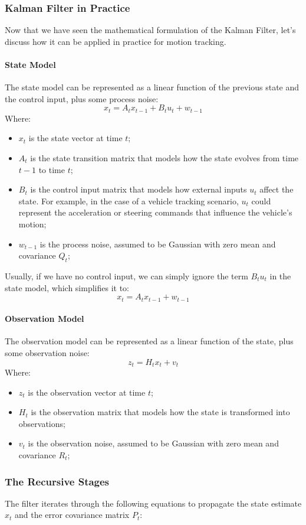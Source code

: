 \subsubsection{Kalman Filter in Practice}
Now that we have seen the mathematical formulation of the Kalman Filter, let's discuss how it can be applied in practice for motion tracking.

\paragraph{State Model}
The state model can be represented as a linear function of the previous state and the control input, plus some process noise:
\[ x_t = A_t x_{t-1} + B_t u_t + w_{t-1} \] 
Where:
\begin{itemize}
    \item $x_t$ is the state vector at time $t$;
    \item $A_t$ is the state transition matrix that models how the state evolves from time $t-1$ to time $t$;
    \item $B_t$ is the control input matrix that models how external inputs $u_t$ affect the state. For example,
    in the case of a vehicle tracking scenario, $u_t$ could represent the acceleration or steering commands that influence the vehicle's motion;
    \item $w_{t-1}$ is the process noise, assumed to be Gaussian with zero mean and covariance $Q_t$;
\end{itemize}
Usually, if we have no control input, we can simply ignore the term $B_t u_t$ in the state model, which simplifies it to:
\[ x_t = A_t x_{t-1} + w_{t-1} \]

\paragraph{Observation Model}
The observation model can be represented as a linear function of the state, plus some observation noise:
\[ z_t = H_t x_t + v_t \]
Where:
\begin{itemize}
    \item $z_t$ is the observation vector at time $t$;
    \item $H_t$ is the observation matrix that models how the state is transformed into observations;
    \item $v_t$ is the observation noise, assumed to be Gaussian with zero mean and covariance $R_t$;
\end{itemize}

\subsubsection{The Recursive Stages}
The filter iterates through the following equations to propagate the state estimate $\hat{x}_t$ 
and the error covariance matrix $P_t$:

